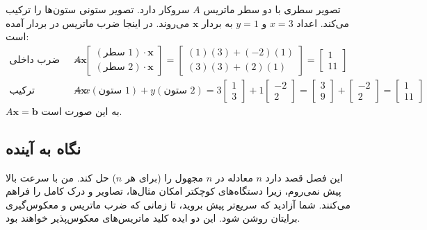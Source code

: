 \documentclass[12pt, a4paper]{book}
\begin{document}
	تصویر سطری با دو سطر ماتریس \(A\) سروکار دارد. تصویر ستونی ستون‌ها را ترکیب می‌کند. اعداد \(x=3\) و \(y=1\) به بردار \(\mathbf{x}\) می‌روند. در اینجا ضرب ماتریس در بردار آمده است:
	\begin{align*}
		\text{ضرب داخلی با سطرها} \quad A\mathbf{x} &= \begin{bmatrix} (\text{سطر } 1) \cdot \mathbf{x} \\ (\text{سطر } 2) \cdot \mathbf{x} \end{bmatrix} = \begin{bmatrix} (1)(3) + (-2)(1) \\ (3)(3) + (2)(1) \end{bmatrix} = \begin{bmatrix} 1 \\ 11 \end{bmatrix} \\
		\text{ترکیب ستون‌ها} \quad A\mathbf{x} &= x(\text{ستون } 1) + y(\text{ستون } 2) = 3\begin{bmatrix} 1 \\ 3 \end{bmatrix} + 1\begin{bmatrix} -2 \\ 2 \end{bmatrix} = \begin{bmatrix} 3 \\ 9 \end{bmatrix} + \begin{bmatrix} -2 \\ 2 \end{bmatrix} = \begin{bmatrix} 1 \\ 11 \end{bmatrix}
	\end{align*}
	\(A\mathbf{x}=\mathbf{b}\) به این صورت است.
	
	\subsection*{نگاه به آینده}
	این فصل قصد دارد \( n \) معادله در \( n \) مجهول را (برای هر \( n \)) حل کند. من با سرعت بالا پیش نمی‌روم، زیرا دستگاه‌های کوچکتر امکان مثال‌ها، تصاویر و درک کامل را فراهم می‌کنند. شما آزادید که سریع‌تر پیش بروید، تا زمانی که ضرب ماتریس و معکوس‌گیری برایتان روشن شود. این دو ایده کلید ماتریس‌های معکوس‌پذیر خواهند بود.
	
\end{document}
